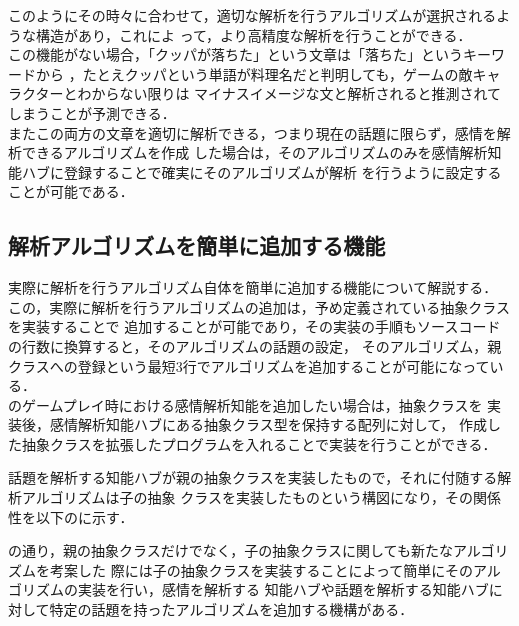 
このようにその時々に合わせて，適切な解析を行うアルゴリズムが選択されるような構造があり，これによ
って，より高精度な解析を行うことができる．
\\
この機能がない場合，「クッパが落ちた」という文章は「落ちた」というキーワードから
，たとえクッパという単語が料理名だと判明しても，ゲームの敵キャラクターとわからない限りは
マイナスイメージな文と解析されると推測されてしまうことが予測できる．
\\
またこの両方の文章を適切に解析できる，つまり現在の話題に限らず，感情を解析できるアルゴリズムを作成
した場合は，そのアルゴリズムのみを感情解析知能ハブに登録することで確実にそのアルゴリズムが解析
を行うように設定することが可能である．

\subsection{解析アルゴリズムを簡単に追加する機能}
実際に解析を行うアルゴリズム自体を簡単に追加する機能について解説する．
\\
この，実際に解析を行うアルゴリズムの追加は，予め定義されている抽象クラスを実装することで
追加することが可能であり，その実装の手順もソースコードの行数に換算すると，そのアルゴリズムの話題の設定，
そのアルゴリズム，親クラスへの登録という最短3行でアルゴリズムを追加することが可能になっている．\\

のゲームプレイ時における感情解析知能を追加したい場合は，抽象クラスを
実装後，感情解析知能ハブにある抽象クラス型を保持する配列に対して，
作成した抽象クラスを拡張したプログラムを入れることで実装を行うことができる．

話題を解析する知能ハブが親の抽象クラスを実装したもので，それに付随する解析アルゴリズムは子の抽象
クラスを実装したものという構図になり，その関係性を以下のに示す．
\\

の通り，親の抽象クラスだけでなく，子の抽象クラスに関しても新たなアルゴリズムを考案した
際には子の抽象クラスを実装することによって簡単にそのアルゴリズムの実装を行い，感情を解析する
知能ハブや話題を解析する知能ハブに対して特定の話題を持ったアルゴリズムを追加する機構がある．

\newpage

